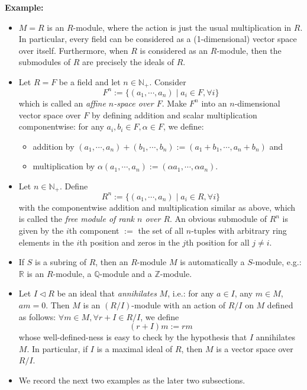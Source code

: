 \noindent\textbf{Example:}
\begin{itemize}
    \item $M=R$ is an $R$-module, where the action is just the usual multiplication in $R$. In particular, every field can be considered as a (1-dimensional) vector space over itself. Furthermore, when $R$ is considered as an $R$-module, then the submodules of $R$ are precisely the ideals of $R$.

    \item Let $R=F$ be a field and let $n \in \mathbb{N}_+$. Consider
    $$F^n:= \{(a_1 ,\cdots, a_n) \mid a_i \in F,\forall i\}$$
    which is called an \textit{affine $n$-space over $F$}. Make $F^n$ into an $n$-dimensional vector space over $F$ by defining addition and scalar multiplication componentwise: for any $a_i,b_i \in F, \alpha \in F$, we define:
    \begin{itemize}
        \item addition by $(a_1 ,\cdots, a_n) + (b_1 ,\cdots, b_n) := (a_1 +b_1 ,\cdots, a_n+b_n)$ and
        \item multiplication by $\alpha(a_1,\cdots, a_n) := (\alpha a_1,\cdots, \alpha a_n)$.
    \end{itemize}

    \item Let $n \in \mathbb{N}_+$. Define
    $$R^n := \{(a_1 ,\cdots, a_n) \mid a_i \in R ,\forall i\}$$
    with the componentwise addition and multiplication similar as above, which is called the \textit{free module of rank $n$ over $R$}. An obvious submodule of $R^n$ is given by the $i$th component $:=$ the set of all $n$-tuples with arbitrary ring elements in the $i$th position and zeros in the $j$th position for all $j \neq i$.

    \item If $S$ is a subring of $R$, then an $R$-module $M$ is automatically a $S$-module, e.g.: $\mathbb{R}$ is an $R$-module, a $\mathbb{Q}$-module and a $\mathbb{Z}$-module.

    \item Let $I \triangleleft R$ be an ideal that \textit{annihilates} $M$, i.e.: for any $a \in I$, any $m \in M$, $am=0$. Then $M$ is an $(R/I)$-module with an action of $R/I$ on $M$ defined as follows: $\forall m \in M, \forall r+I \in R/I$, we define
    $$(r+I) m:= rm$$
    whose well-defined-ness is easy to check by the hypothesis that $I$ annihilates $M$. In particular, if $I$ is a maximal ideal of $R$, then $M$ is a vector space over $R/I$.

    \item We record the next two examples as the later two subsections.
\end{itemize}


